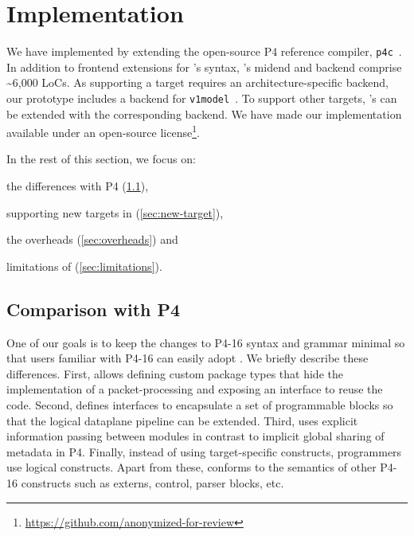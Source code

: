 \documentclass[letterpaper,twocolumn,10pt]{article}
\begin{document}







\section{Implementation}
\label{sec:implementation}
We have implemented \ucomp by extending the open-source P4 reference
compiler, \texttt{p4c}~\cite{p4c}. In addition to frontend extensions
for \ulang's syntax, \ucomp's midend and backend comprise
\textasciitilde 6,000 LoCs. As supporting a target requires an
architecture-specific backend, our prototype includes a backend for
\texttt{v1model}~\cite{v1model.p4}. To support other targets, \ucomp's
can be extended with the corresponding backend. We have made our
implementation available under an open-source
license\footnote{\url{https://github.com/anonymized-for-review}}.

In the rest of this section, we focus on:
\begin{enumerate*}[label=(\roman*)]
  \item the differences with P4 (\cref{sec:comparison}),
  \item supporting new targets in \ucomp (\cref{sec:new-target}),
  \item the overheads (\cref{sec:overheads}) and
  \item limitations of \ulang (\cref{sec:limitations}).
\end{enumerate*}


\subsection{Comparison with P4}
\label{sec:comparison}
One of our goals is to keep the changes to P4-16 syntax and grammar
minimal so that users familiar with P4-16 can easily adopt \ulang. We
briefly describe these differences. First, \ulang allows defining
custom package types that hide the implementation of a
packet-processing and exposing an interface to reuse the code. Second,
\uarch defines interfaces to encapsulate a set of programmable blocks
so that the logical dataplane pipeline can be extended. Third, \uarch
uses explicit information passing between modules in contrast to
implicit global sharing of metadata in P4.  Finally, instead of using
target-specific constructs, programmers use logical \uarch constructs.
Apart from these, \ulang conforms to the semantics of other P4-16
constructs such as externs, control, parser blocks, etc.
\end{document}
